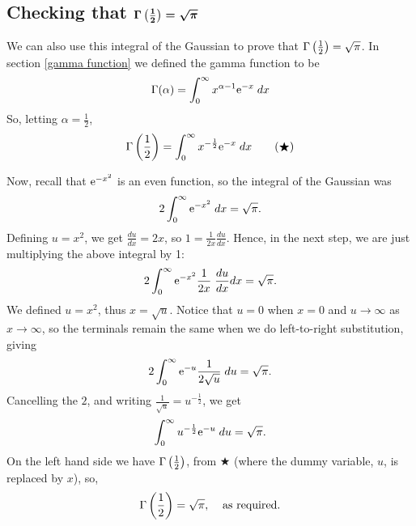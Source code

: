 \subsection{Checking that $\boldsymbol{\Gamma\left(\frac{1}{2}\right) = \sqrt{\pi}}$} \label{gamma1/2 = sqrt(pi)}
We can also use this integral of the Gaussian to prove that $\Gamma\left(\frac{1}{2}\right) = \sqrt{\pi}$. In section \ref{gamma function} we defined the gamma function to be
\[
\Gamma(\alpha) = \int_0^\infty x^{\alpha-1}\mathrm{e}^{-x} \; dx
\] 
So, letting $\alpha = \frac{1}{2}$,
\[
\Gamma\left(\frac{1}{2}\right) = \int_0^\infty x^{-\frac{1}{2}}\mathrm{e}^{-x} \; dx \tag{$\bigstar$}
\]
\bigskip

\noindent Now, recall that $\mathrm{e}^{-x^2}$ is an even function, so the integral of the Gaussian was
\[
2\int_0^\infty \mathrm{e}^{-x^2} \; dx = \sqrt{\pi}.
\]
Defining $u = x^2$, we get $\frac{du}{dx} = 2x$, so $1 = \frac{1}{2x}\frac{du}{dx}$. Hence, in the next step, we are just multiplying the above integral by 1:
\[
2\int_0^\infty \mathrm{e}^{-x^2} \frac{1}{2x} \; \frac{du}{dx} dx = \sqrt{\pi}.
\]
We defined $u = x^2$, thus $x = \sqrt{u}$. Notice that $u = 0$ when $x = 0$ and $u \rightarrow \infty$ as $x \rightarrow \infty$, so the terminals remain the same when we do left-to-right substitution, giving
\[
2\int_0^\infty \mathrm{e}^{-u} \frac{1}{2\sqrt{u}} \; du = \sqrt{\pi}.
\] 
Cancelling the $2$, and writing $\frac{1}{\sqrt{u}} = u^{-\frac{1}{2}}$, we get
\[
\int_0^\infty u^{-\frac{1}{2}} \mathrm{e}^{-u} \; du = \sqrt{\pi}.
\]
On the left hand side we have $\Gamma\left(\frac{1}{2}\right)$, from $\bigstar$ (where the dummy variable, $u$, is replaced by $x$), so,
\[
\Gamma\left(\frac{1}{2}\right) = \sqrt{\pi}, \;\;\;\; \text{as required.}
\]
